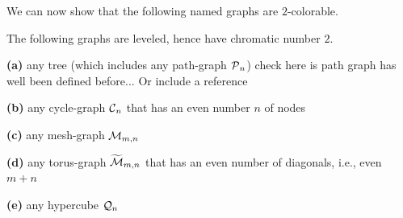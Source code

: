 We can now show that the following named graphs are $2$-colorable.

\begin{corol}
\label{thm:list-2-colorables}
The following graphs are leveled, hence have chromatic number $2$.

{\bf (a)}
any tree (which includes any path-graph $\mbox{$\cal P$}_n$)
{\Denis check here is path graph has well been defined before... Or include a reference}

{\bf (b)}
any cycle-graph $\mbox{$\cal C$}_n$ that has an even number $n$ of nodes

{\bf (c)}
any mesh-graph $\mbox{$\cal M$}_{m,n}$

{\bf (d)}
any torus-graph $\widetilde{\mbox{$\cal M$}}_{m,n}$ that has an even number of
diagonals, i.e., even $m+n$

{\bf (e)}
any hypercube $\mbox{$\cal Q$}_n$
\end{corol}


